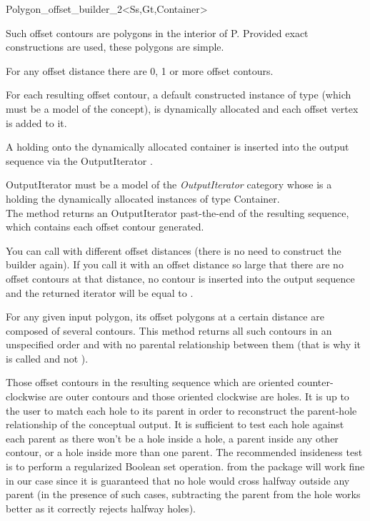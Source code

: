 \begin{ccRefClass}{Polygon_offset_builder_2<Ss,Gt,Container>}
{Such offset contours are polygons in the interior of P. Provided exact constructions are used, these polygons are simple.

For any offset distance  there are 0, 1 or more offset contours.

For each resulting offset contour, a default constructed instance of  type (which must be a model of the  concept), is dynamically allocated and each offset vertex is added to it.

A  holding onto the dynamically allocated container is inserted into the output sequence via the OutputIterator .

OutputIterator must be a model of the \textit{OutputIterator} category whose  is a  holding the dynamically allocated instances of type Container.\\
The method returns an OutputIterator past-the-end of the resulting sequence, which contains each offset contour generated.

You can call  with different offset distances (there is no need to construct the builder  again). If you call it with an offset distance so large that there are no offset contours at that distance, no contour is inserted into the output sequence and the returned iterator will be equal to .

For any given input polygon, its offset polygons at a certain distance are composed of several contours. This method returns all such contours in an unspecified order and with no parental relationship between them (that is why it is called  and not ).

Those offset contours in the resulting sequence which are oriented counter-clockwise are outer contours and those oriented clockwise are holes. It is up to the user to match each hole to its parent in order to reconstruct the parent-hole relationship of the conceptual output. It is sufficient to test each hole against each parent as there won't be a hole inside a hole, a parent inside any other contour, or a hole inside more than one parent. The recommended insideness test is to perform a regularized Boolean set operation.  from the  package will work fine in our case since it is guaranteed that no hole would cross halfway outside any parent (in the presence of such cases, subtracting the parent from the hole works better as it correctly rejects halfway holes).

}
\end{ccRefClass}
